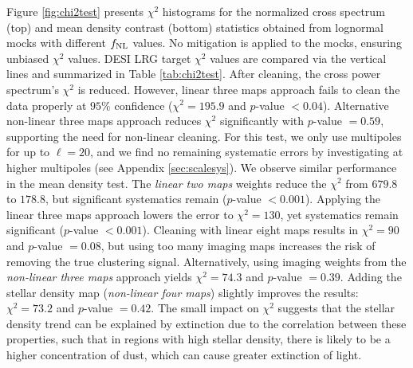 Figure \ref{fig:chi2test} presents $\chi^{2}$ histograms for the normalized cross spectrum (top) and mean density contrast (bottom) statistics obtained from lognormal mocks with different $f_{\rm NL}$ values.  No mitigation is applied to the mocks, ensuring unbiased $\chi^{2}$ values. DESI LRG target $\chi^{2}$ values are compared via the vertical lines and summarized in Table \ref{tab:chi2test}. After cleaning, the cross power spectrum's $\chi^{2}$ is reduced. However, linear three maps approach fails to clean the data properly at $95\%$ confidence ($\chi^{2}=195.9$ and $p$-value $< 0.04$). Alternative non-linear three maps approach reduces $\chi^{2}$ significantly with $p$-value $=0.59$, supporting the need for non-linear cleaning. For this test, we only use multipoles for up to $\ell=20$, and we find no remaining systematic errors by investigating at higher multipoles (see Appendix \ref{sec:scalesys}). We observe similar performance in the mean density test. The \textit{linear two maps} weights reduce the $\chi^{2}$ from $679.8$ to $178.8$, but significant systematics remain ($p$-value $<0.001$). Applying the linear three maps approach lowers the error to $\chi^{2}=130$, yet systematics remain significant ($p$-value $<0.001$). Cleaning with linear eight maps results in $\chi^{2}=90$ and $p$-value $=0.08$, but using too many imaging maps increases the risk of removing the true clustering signal. Alternatively, using imaging weights from the \textit{non-linear three maps} approach yields $\chi^{2}=74.3$ and $p$-value $=0.39$. Adding the stellar density map (\textit{non-linear four maps}) slightly improves the results: $\chi^{2}=73.2$ and $p$-value $=0.42$. The small impact on $\chi^{2}$ suggests that the stellar density trend can be explained by extinction due to the correlation between these properties, such that in regions with high stellar density, there is likely to be a higher concentration of dust, which can cause greater extinction of light. 
